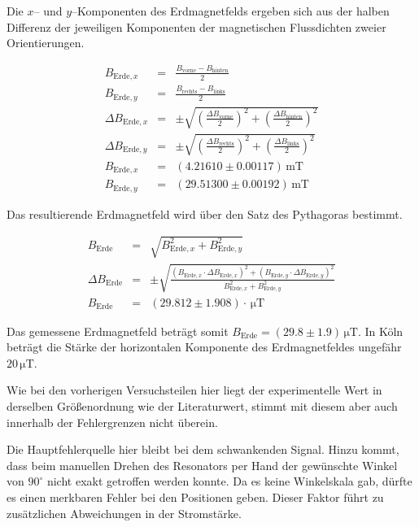 \documentclass[12pt,a4paper]{scrartcl}
\numberwithin{equation}{section} %
\begin{document}
Die $x$-- und $y$--Komponenten des Erdmagnetfelds ergeben sich aus der halben Differenz der jeweiligen Komponenten der magnetischen Flussdichten zweier Orientierungen.

\begin{eqnarray}
	B_{\mathrm{Erde},x} &=& \frac{B_\mathrm{vorne}-B_\mathrm{hinten}}{2} \\
	B_{\mathrm{Erde},y} &=& \frac{B_\mathrm{rechts}-B_\mathrm{links}}{2} \\
	\Delta B_{\mathrm{Erde}, x} &=& \pm\sqrt{\left( \frac{\Delta B_\mathrm{vorne}}{2}\right) ^2 + \left( \frac{\Delta B_\mathrm{hinten}}{2}\right) ^2} \\
	\Delta B_{\mathrm{Erde}, y} &=& \pm\sqrt{\left( \frac{\Delta B_\mathrm{rechts}}{2}\right) ^2 + \left( \frac{\Delta B_\mathrm{links}}{2}\right) ^2} \\
	B_{\mathrm{Erde},x} &=& (4.21610 \pm 0.00117) \mathrm{\, mT} \\
	B_{\mathrm{Erde},y} &=& (29.51300 \pm 0.00192) \mathrm{\, mT}
\end{eqnarray}

\noindent
Das resultierende Erdmagnetfeld wird über den Satz des Pythagoras bestimmt.

\begin{eqnarray}
	B_\mathrm{Erde} &=& \sqrt{B_{\mathrm{Erde}, x}^2 + B_{\mathrm{Erde}, y}^2}\\
	\Delta B_\mathrm{Erde} &=& \pm\sqrt{\frac{(B_{\mathrm{Erde},x} \cdot \Delta B_{\mathrm{Erde}, x})^2 + (B_{\mathrm{Erde},y} \cdot \Delta B_{\mathrm{Erde}, y})^2}{B_{\mathrm{Erde}, x}^2 + B_{\mathrm{Erde},y}^2}}\\
	B_\mathrm{Erde} &=& (29.812 \pm 1.908) \cdot \mathrm{\, \mu T}
\end{eqnarray}

\noindent
Das gemessene Erdmagnetfeld beträgt somit $B_\mathrm{Erde} = (29.8 \pm 1.9) \mathrm{\,\mu T}$. In Köln beträgt die Stärke der horizontalen Komponente des Erdmagnetfeldes ungefähr $20 \mathrm{\,\mu T}$. \cite{Erdmagnetfeld}

Wie bei den vorherigen Versuchsteilen hier liegt der experimentelle Wert in derselben Größenordnung wie der Literaturwert, stimmt mit diesem aber auch innerhalb der Fehlergrenzen nicht überein.

Die Hauptfehlerquelle hier bleibt bei dem schwankenden Signal. Hinzu kommt, dass beim manuellen Drehen des Resonators per Hand der gewünschte Winkel von $90^{\circ} $ nicht exakt getroffen werden konnte. Da es keine Winkelskala gab, dürfte es einen merkbaren Fehler bei den Positionen geben. Dieser Faktor führt zu zusätzlichen Abweichungen in der Stromstärke.
\end{document}
